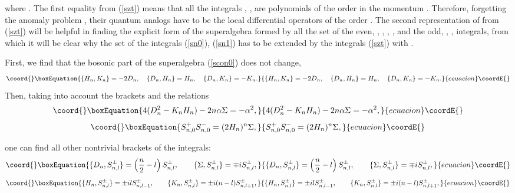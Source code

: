 \documentclass[a4paper,12pt]{article}
\begin{document}
where \coordHE{}.
The first equality from (\ref{szt}) means that all the
integrals
\coordHE{}, \coordHE{}, are polynomials
of the order \coordHE{} in the momentum \coordHE{}.
Therefore, forgetting the anomaly
problem \cite{P1,KP1},
their quantum analogs
have to be the local differential operators of
the order \coordHE{}.
The second representation of \coordHE{} from (\ref{szt})
will be  helpful  in finding the explicit form of
the superalgebra formed by all the set of
the even,
\coordHE{}, \coordHE{}, \coordHE{}, \myHighlight{$\Sigma$}\coordHE{},
and the odd, \coordHE{}, \coordHE{},
integrals, from which it will be clear why
the set of the integrals (\ref{sn0}), (\ref{sn1})
has to be extended
by the integrals (\ref{szt}) with \coordHE{}.


First, we find that the bosonic part of the superalgebra
(\ref{scon0}) does not change,
\begin{equation}\coord{}\boxEquation{
\{H_n,K_n\}=-2D_n,\quad
\{D_n,H_n\}=H_n,\quad
\{D_n,K_n\}=-K_n.
\label{soclas}
}{
\{H_n,K_n\}=-2D_n,\quad
\{D_n,H_n\}=H_n,\quad
\{D_n,K_n\}=-K_n.
}{ecuacion}\coordE{}\end{equation}
Then, taking into account the brackets
\coordHE{}
and the relations
\begin{equation}\coord{}\boxEquation{
4(D_n^2-K_nH_n)-2n\alpha\Sigma=
-\alpha^2,
\label{casc}
}{
4(D_n^2-K_nH_n)-2n\alpha\Sigma=
-\alpha^2,
}{ecuacion}\coordE{}\end{equation}
\begin{equation}\coord{}\boxEquation{
S^+_{n,0}S^-_{n,0}=(2H_n)^n\Sigma,
\label{ssh}
}{
S^+_{n,0}S^-_{n,0}=(2H_n)^n\Sigma,
}{ecuacion}\coordE{}\end{equation}

one can find all other nontrivial brackets
of the integrals:
\begin{equation}\coord{}\boxEquation{
\{D_n,S^\pm_{n,l}\}=\left(\frac{n}{2}-l\right)
S^\pm_{n,l},\qquad
\{\Sigma,S^\pm_{n,l}\}=\mp iS^\pm_{n,l},
\label{dsig}
}{
\{D_n,S^\pm_{n,l}\}=\left(\frac{n}{2}-l\right)
S^\pm_{n,l},\qquad
\{\Sigma,S^\pm_{n,l}\}=\mp iS^\pm_{n,l},
}{ecuacion}\coordE{}\end{equation}
\begin{equation}\coord{}\boxEquation{
\{H_n,S^\pm_{n,l}\}=\pm ilS^\pm_{n,l-1},\qquad
\{K_n,S^\pm_{n,l} \}=\pm i(n-l)S^\pm_{n,l+1},
\label{hkss}
}{
\{H_n,S^\pm_{n,l}\}=\pm ilS^\pm_{n,l-1},\qquad
\{K_n,S^\pm_{n,l} \}=\pm i(n-l)S^\pm_{n,l+1},
}{ecuacion}\coordE{}\end{equation}
\end{document}
